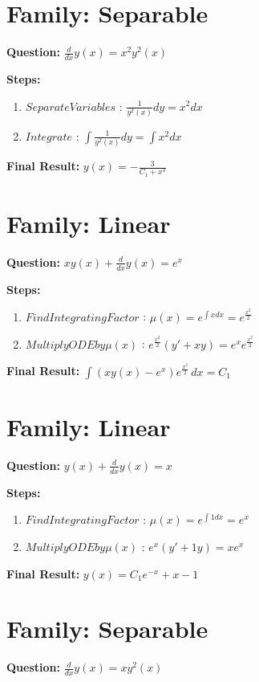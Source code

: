 \documentclass{article}
\begin{document}
\section*{Family: Separable}
\textbf{Question:} $\frac{d}{d x} y{\left(x \right)} = x^{2} y^{2}{\left(x \right)}$

\textbf{Steps:}
\begin{enumerate}
\item $Separate Variables$ :  $\frac{1}{y^{2}{\left(x \right)}} dy = x^{2} dx$
\item $Integrate$ :  $\int \frac{1}{y^{2}{\left(x \right)}} dy = \int x^{2} dx$
\end{enumerate}
\textbf{Final Result:} $y{\left(x \right)} = - \frac{3}{C_{1} + x^{3}}$

\section*{Family: Linear}
\textbf{Question:} $x y{\left(x \right)} + \frac{d}{d x} y{\left(x \right)} = e^{x}$

\textbf{Steps:}
\begin{enumerate}
\item $Find Integrating Factor$ :  $\mu(x) = e^{\int x dx} = e^{\frac{x^{2}}{2}}$
\item $Multiply ODE by \mu(x)$ :  $e^{\frac{x^{2}}{2}}(y' + xy) = e^{x} e^{\frac{x^{2}}{2}}$
\end{enumerate}
\textbf{Final Result:} $\int \left(x y{\left(x \right)} - e^{x}\right) e^{\frac{x^{2}}{2}}\, dx = C_{1}$

\section*{Family: Linear}
\textbf{Question:} $y{\left(x \right)} + \frac{d}{d x} y{\left(x \right)} = x$

\textbf{Steps:}
\begin{enumerate}
\item $Find Integrating Factor$ :  $\mu(x) = e^{\int 1 dx} = e^{x}$
\item $Multiply ODE by \mu(x)$ :  $e^{x}(y' + 1y) = x e^{x}$
\end{enumerate}
\textbf{Final Result:} $y{\left(x \right)} = C_{1} e^{- x} + x - 1$

\section*{Family: Separable}
\textbf{Question:} $\frac{d}{d x} y{\left(x \right)} = x y^{2}{\left(x \right)}$
\end{document}
